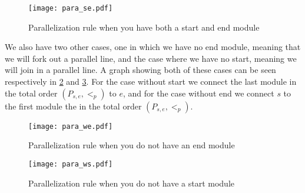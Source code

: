 \begin{figure}[h]
\centering
\texttt{[image: para\_se.pdf]}
\caption{Parallelization rule when you have both a start and end module}
\label{fig:para_se}
\end{figure}


We also have two other cases, one in which we have no end module, meaning that we will fork out a parallel line, and the case where we have no start, meaning we will join in a parallel line. A graph showing both of these cases can be seen respectively in \cref{fig:para_we} and \cref{fig:para_ws}. For the case without start we connect the last module in the total order $(P_{s,e}, <_p)$ to $e$, and for the case without end we connect $s$ to the first module the in the total order $(P_{s,e}, <_p)$.


\begin{figure}[h]
\centering
\texttt{[image: para\_we.pdf]}
\caption{Parallelization rule when you do not have an end module}
\label{fig:para_we}
\end{figure}

\begin{figure}[h]
\centering
\texttt{[image: para\_ws.pdf]}
\caption{Parallelization rule when you do not have a start module}
\label{fig:para_ws}
\end{figure}

